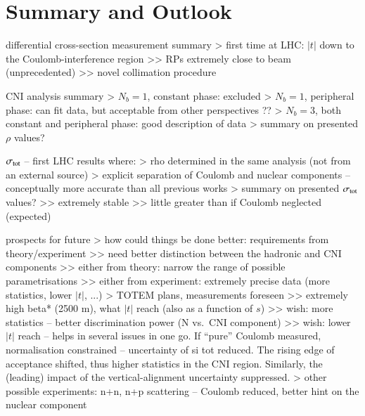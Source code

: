\section{Summary and Outlook}

\> differential cross-section measurement summary
\>> first time at LHC: $|t|$ down to the Coulomb-interference region
\>>> RPs extremely close to beam (unprecedented)
\>>> novel collimation procedure


\> CNI analysis summary
\>> $N_b=1$, constant phase: excluded
\>> $N_b=1$, peripheral phase: can fit data, but acceptable from other perspectives ??
\>> $N_b=3$, both constant and peripheral phase: good description of data
\>> summary on presented $\rho$ values?


\> $\sigma_{\rm tot}$ -- first LHC results where:
\>> rho determined in the same analysis (not from an external source)
\>> explicit separation of Coulomb and nuclear components -- conceptually more accurate than all previous works
\>> summary on presented $\sigma_{\rm tot}$ values?
\>>> extremely stable
\>>> little greater than if Coulomb neglected (expected)

\> prospects for future
\>> how could things be done better: requirements from theory/experiment
\>>> need better distinction between the hadronic and CNI components
\>>> either from theory: narrow the range of possible parametrisations
\>>> either from experiment: extremely precise data (more statistics, lower $|t|$, ...)
\>> TOTEM plans, measurements foreseen
\>>> extremely high beta* (2500 m), what $|t|$ reach (also as a function of $s$)
\>>> wish: more statistics -- better discrimination power (N vs.~CNI component)
\>>> wish: lower $|t|$ reach -- helps in several issues in one go. If ``pure'' Coulomb measured, normalisation constrained -- uncertainty of si tot reduced. The rising edge of acceptance shifted, thus higher statistics in the CNI region. Similarly, the (leading) impact of the vertical-alignment uncertainty suppressed.
\>> other possible experiments: n+n, n+p scattering -- Coulomb reduced, better hint on the nuclear component
